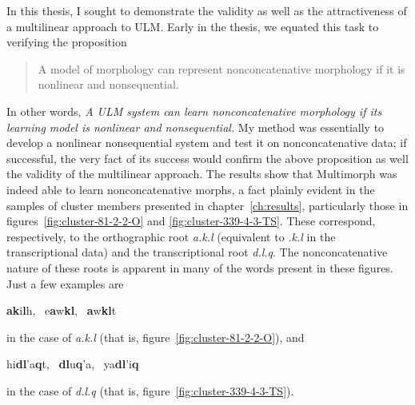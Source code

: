 
In this thesis, I sought to demonstrate the validity as well as the attractiveness of a multilinear approach to ULM. 
Early in the thesis,
we equated this task to verifying the proposition
\begin{quote}\noindent
A model of morphology can represent nonconcatenative morphology if it is nonlinear and nonsequential.
\end{quote}
In other words, \textit{A ULM system can learn nonconcatenative morphology if its learning model is nonlinear and nonsequential.}
My method was essentially to develop a nonlinear nonsequential system and test it on nonconcatenative data; if successful, the very fact of its success would confirm the above proposition as well the validity of the multilinear approach.
The results show that Multimorph was indeed able to learn nonconcatenative morphs, %
a fact plainly evident in the samples of cluster members presented in chapter~\ref{ch:results},
particularly those in figures~\ref{fig:cluster-81-2-2-O} and \ref{fig:cluster-339-4-3-TS}. These correspond, respectively, to the orthographic root \textit{a.k.l} (equivalent to \textit{.k.l} in the transcriptional data) and 
the transcriptional root \textit{d.l.q}. %
The nonconcatenative nature of these roots is apparent in many of the words present in these figures. Just a few examples are
\begin{center}
\textbf{a}\textbf{k}i\textbf{l}h, \, e\textbf{a}w\textbf{k}\textbf{l}, \, \textbf{a}w\textbf{k}\textbf{l}t 
\end{center}
in the case of \textit{a.k.l} (that is, figure~\ref{fig:cluster-81-2-2-O}), and
\begin{center}
\vspace{-28pt}
\ex hi\textbf{d}\textbf{l}\a'{a}\textbf{q}t, \, \textbf{d}\textbf{l}u\textbf{q}\a'{a}, \, ya\textbf{d}\textbf{l}\a'{i}\textbf{q}
\end{center}
in the case of \textit{d.l.q} (that is, figure~\ref{fig:cluster-339-4-3-TS}).

%

